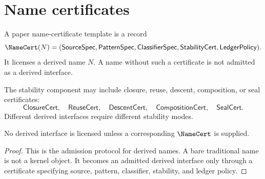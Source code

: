 \section{Name certificates}

\begin{definition}
A paper name-certificate template is a record
$$
\NameCert(N)=(\mathsf{SourceSpec},\mathsf{PatternSpec},\mathsf{ClassifierSpec},\mathsf{StabilityCert},\mathsf{LedgerPolicy}).
$$
It licenses a derived name \(N\).  A name without such a certificate is not admitted as a derived interface.
\end{definition}

\begin{definition}
The stability component may include closure, reuse, descent, composition, or seal certificates:
$$
\mathsf{ClosureCert},\quad
\mathsf{ReuseCert},\quad
\mathsf{DescentCert},\quad
\mathsf{CompositionCert},\quad
\mathsf{SealCert}.
$$
Different derived interfaces require different stability modes.
\end{definition}

\begin{theorem}
\label{thm:proof-sprint-derived-interfaces-require-certificates}
No derived interface is licensed unless a corresponding \(\NameCert\) is supplied.
\end{theorem}
\begin{proof}
This is the admission protocol for derived names.  A bare traditional name is not a kernel object.  It becomes an admitted derived interface only through a certificate specifying source, pattern, classifier, stability, and ledger policy.
\end{proof}
